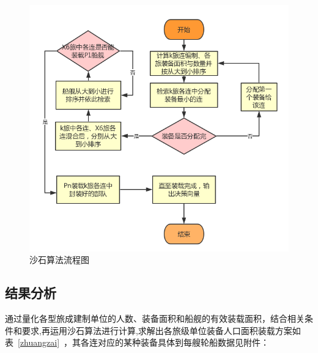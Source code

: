 \documentclass{whutmod}
\begin{document}
\begin{figure}[H]
	\centering
	\includegraphics[width=.9\textwidth]{figures/shashisuanfa.png}
	\caption{沙石算法流程图}\label{shashiluc}
\end{figure}


\subsection{结果分析}
通过量化各型旅成建制单位的人数、装备面积和船舰的有效装载面积，结合相关条件和要求,再运用沙石算法进行计算,求解出各旅级单位装备人口面积装载方案如表~\ref{zhuangzai}~，其各连对应的某种装备具体到每艘轮船数据见附件：
\end{document}
